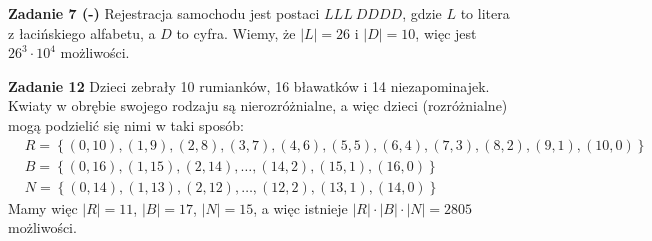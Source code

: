 \documentclass[a4paper,12pt]{article}
\newcommand{\set}[1]{\left \{ #1 \right \}}
\newcommand{\pair}[1]{\left( #1 \right)}
\begin{document}
\noindent \newline \textbf{Zadanie 7 (-)} \newline
Rejestracja samochodu jest postaci $LLL\ DDDD$, gdzie $L$ to litera z łacińskiego alfabetu, a $D$ to cyfra. Wiemy, że $|L|=26$ i $|D|=10$, więc jest $26^3\cdot 10^4$ możliwości.

\noindent \newline \textbf{Zadanie 12} \newline
Dzieci zebrały 10 rumianków, 16 bławatków i 14 niezapominajek. Kwiaty w obrębie swojego rodzaju są nierozróżnialne, a więc dzieci (rozróżnialne) mogą podzielić się nimi w taki sposób:
$$
\begin{aligned}
&R = \set{ \pair{0,10}, \pair{1,9}, \pair{2,8}, \pair{3,7}, \pair{4,6}, \pair{5,5}, \pair{6,4}, \pair{7,3}, \pair{8,2}, \pair{9,1}, \pair{10,0} } \\
&B = \set{ \pair{0, 16},\pair{1, 15}, \pair{2, 14}, \ldots, \pair{14, 2}, \pair{15, 1}, \pair{16, 0} } \\
&N = \set{ \pair{0, 14},\pair{1, 13}, \pair{2, 12}, \ldots, \pair{12, 2}, \pair{13, 1}, \pair{14, 0} }
\end{aligned}
$$
\noindent Mamy więc $|R| = 11$, $|B| = 17$, $|N| = 15$, a więc istnieje $|R| \cdot |B| \cdot |N| = 2805$ możliwości.
\end{document}
